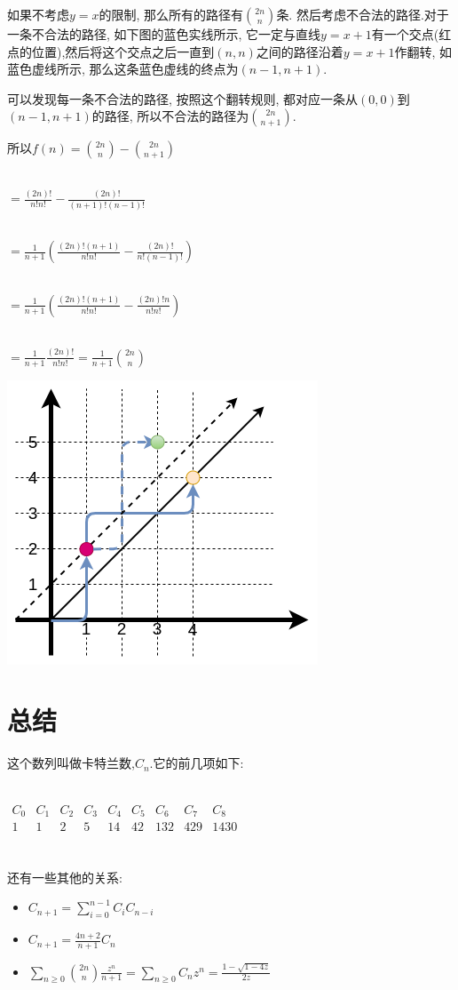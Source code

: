 \documentclass{article}
\begin{document}
如果不考虑$y=x$的限制, 那么所有的路径有$\binom{2n}{n}$条. 然后考虑不合法的路径.对于一条不合法的路径, 如下图的蓝色实线所示, 它一定与直线$y=x+1$有一个交点(红点的位置),然后将这个交点之后一直到$(n,n)$之间的路径沿着$y=x+1$作翻转, 如蓝色虚线所示, 那么这条蓝色虚线的终点为$(n-1,n+1)$. \par
可以发现每一条不合法的路径, 按照这个翻转规则, 都对应一条从$(0,0)$到$(n-1,n+1)$的路径, 所以不合法的路径为$\binom{2n}{n+1}$. \par
所以$f(n)=\binom{2n}{n}-\binom{2n}{n+1}$\par
~\\
$=\frac{(2n)!}{n!n!}-\frac{(2n)!}{(n+1)!(n-1)!}$\par
~\\
$=\frac{1}{n+1}\left (\frac{(2n)!(n+1)}{n!n!}-\frac{(2n)!}{n!(n-1)!}  \right )$ \par
~\\
$=\frac{1}{n+1}\left (\frac{(2n)!(n+1)}{n!n!}-\frac{(2n)!n}{n!n!}  \right )$\par
~\\
$=\frac{1}{n+1}\frac{(2n)!}{n!n!}=\frac{1}{n+1}\binom{2n}{n}$\par
\includegraphics[scale=0.8]{pic2.png} \par

\section{总结}
这个数列叫做卡特兰数,$C_{n}$.它的前几项如下: \par
~\\
$\begin{matrix} 
C_{0} & C_{1} & C_{2} & C_{3} & C_{4} & C_{5} & C_{6} & C_{7} & C_{8} \\ 
1 & 1 & 2 & 5 & 14 & 42 & 132 & 429 & 1430 \\
\end{matrix}$ \par
~\\
还有一些其他的关系:
\begin{itemize}
	\item $C_{n+1}=\sum_{i=0}^{n-1}C_{i}C_{n-i}$
    \item $C_{n+1}=\frac{4n+2}{n+1}C_{n}$
    \item $\sum_{n\geq 0}\binom{2n}{n}\frac{z^{n}}{n+1}=\sum_{n\geq 0}C_{n}z^{n}=\frac{1-\sqrt{1-4z}}{2z}$
\end{itemize}
\end{document}
